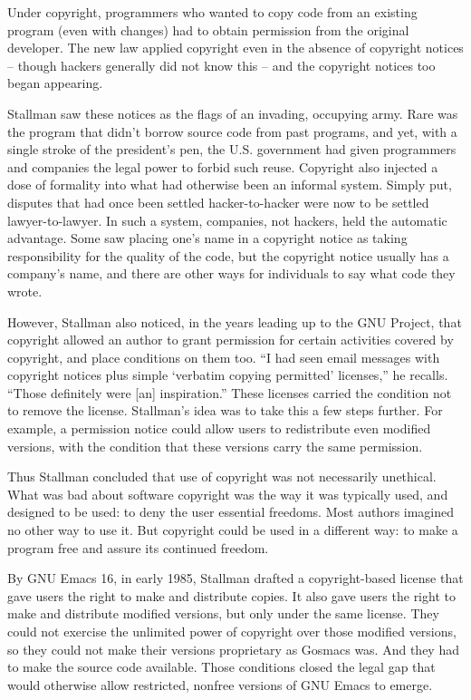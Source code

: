 Under copyright, programmers who wanted to copy code from an existing program (even with changes) had to obtain permission from the original developer. The new law applied copyright even in the absence of copyright notices -- though hackers generally did not know this -- and the copyright notices too began appearing.

Stallman saw these notices as the flags of an invading, occupying army. Rare was the program that didn't borrow source code from past programs, and yet, with a single stroke of the president's pen, the U.S. government had given programmers and companies the legal power to forbid such reuse.  Copyright also injected a dose of formality into what had otherwise been an informal system. Simply put, disputes that had once been settled hacker-to-hacker were now to be settled lawyer-to-lawyer. In such a system, companies, not hackers, held the automatic advantage.  Some saw placing one's name in a copyright notice as taking responsibility for the quality of the code, but the copyright notice usually has a company's name, and there are other ways for individuals to say what code they wrote.

However, Stallman also noticed, in the years leading up to the GNU Project, that copyright allowed an author to grant permission for certain activities covered by copyright, and place conditions on them too.  ``I had seen email messages with copyright notices plus simple `verbatim copying permitted' licenses,'' he recalls. ``Those definitely were [an] inspiration.''  These licenses carried the condition not to remove the license.  Stallman's idea was to take this a few steps further.  For example, a permission notice could allow users to redistribute even modified versions, with the condition that these versions carry the same permission.

Thus Stallman concluded that use of copyright was not necessarily unethical.  What was bad about software copyright was the way it was typically used, and designed to be used: to deny the user essential freedoms.  Most authors imagined no other way to use it.  But copyright could be used in a different way: to make a program free and assure its continued freedom.

By GNU Emacs 16, in early 1985, Stallman drafted a copyright-based license that gave users the right to make and distribute copies. It also gave users the right to make and distribute modified versions, but only under the same license.  They could not exercise the unlimited power of copyright over those modified versions, so they could not make their versions proprietary as Gosmacs was.  And they had to make the source code available.  Those conditions closed the legal gap that would otherwise allow restricted, nonfree versions of GNU Emacs to emerge.

